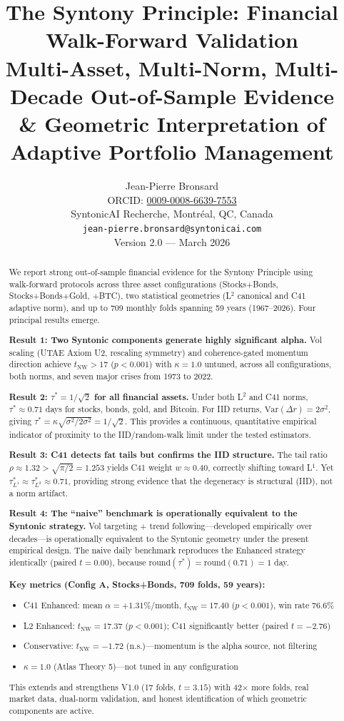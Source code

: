 \documentclass[11pt,a4paper]{article}
\title{\textbf{The Syntony Principle: Financial Walk-Forward Validation}\\[6pt]
\large Multi-Asset, Multi-Norm, Multi-Decade Out-of-Sample Evidence\\[4pt]
\large \& Geometric Interpretation of Adaptive Portfolio Management}
\author{Jean-Pierre Bronsard\\
\small ORCID: \href{https://orcid.org/0009-0008-6639-7553}{0009-0008-6639-7553}\\
\small SyntonicAI Recherche, Montr\'eal, QC, Canada\\
\small \texttt{jean-pierre.bronsard@syntonicai.com}\\[8pt]
\small Version 2.0 --- March 2026}
\date{}
\begin{document}
\maketitle
\thispagestyle{firstpage}

\begin{abstract}
We report strong out-of-sample financial evidence for the Syntony Principle using walk-forward protocols across three asset configurations (Stocks+Bonds, Stocks+Bonds+Gold, +BTC), two statistical geometries (L$^2$ canonical and C41 adaptive norm), and up to 709 monthly folds spanning 59 years (1967--2026). Four principal results emerge.

\textbf{Result 1: Two Syntonic components generate highly significant alpha.} Vol scaling (UTAE Axiom U2, rescaling symmetry) and coherence-gated momentum direction achieve $t_{\text{NW}} > 17$ ($p < 0.001$) with $\kappa = 1.0$ untuned, across all configurations, both norms, and seven major crises from 1973 to 2022.

\textbf{Result 2: $\tau^* = 1/\sqrt{2}$ for all financial assets.} Under both L$^2$ and C41 norms, $\tau^* \approx 0.71$ days for stocks, bonds, gold, and Bitcoin. For IID returns, $\mathrm{Var}(\Delta r) = 2\sigma^2$, giving $\tau^* = \kappa\sqrt{\sigma^2/2\sigma^2} = 1/\sqrt{2}$. This provides a continuous, quantitative empirical indicator of proximity to the IID/random-walk limit under the tested estimators.

\textbf{Result 3: C41 detects fat tails but confirms the IID structure.} The tail ratio $\rho \approx 1.32 > \sqrt{\pi/2} = 1.253$ yields C41 weight $w \approx 0.40$, correctly shifting toward L$^1$. Yet $\tau^*_{L^1} \approx \tau^*_{L^2} \approx 0.71$, providing strong evidence that the degeneracy is structural (IID), not a norm artifact.

\textbf{Result 4: The ``naive'' benchmark is operationally equivalent to the Syntonic strategy.} Vol targeting + trend following---developed empirically over decades---is operationally equivalent to the Syntonic geometry under the present empirical design. The naive daily benchmark reproduces the Enhanced strategy identically (paired $t = 0.00$), because $\mathrm{round}(\tau^*) = \mathrm{round}(0.71) = 1$ day.

\medskip\noindent\textbf{Key metrics (Config A, Stocks+Bonds, 709 folds, 59 years):}
\begin{itemize}[nosep,leftmargin=2em]
  \item C41 Enhanced: mean $\alpha = +1.31\%$/month, $t_{\text{NW}} = 17.40$ ($p < 0.001$), win rate 76.6\%
  \item L2 Enhanced: $t_{\text{NW}} = 17.37$ ($p < 0.001$); C41 significantly better (paired $t = -2.76$)
  \item Conservative: $t_{\text{NW}} = -1.72$ (n.s.)---momentum is the alpha source, not filtering
  \item $\kappa = 1.0$ (Atlas Theory 5)---not tuned in any configuration
\end{itemize}
\medskip\noindent This extends and strengthens V1.0 (17 folds, $t=3.15$) with 42$\times$ more folds, real market data, dual-norm validation, and honest identification of which geometric components are active.


\end{abstract}
\end{document}
